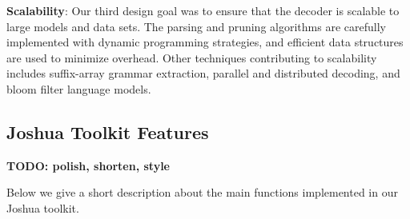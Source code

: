 \documentclass[11pt]{article}
\begin{document}
\textbf{Scalability}: Our third design goal was to ensure that the decoder is scalable to large models and data sets. The parsing and pruning algorithms are carefully implemented with dynamic programming strategies, and efficient data structures are used to minimize overhead. Other techniques contributing to scalability includes suffix-array grammar extraction, parallel and distributed decoding, and bloom filter language models.

\subsection{Joshua Toolkit Features}

\textbf{TODO: polish, shorten, style}

Below we give a short description about the main functions implemented in our Joshua toolkit.
\end{document}
